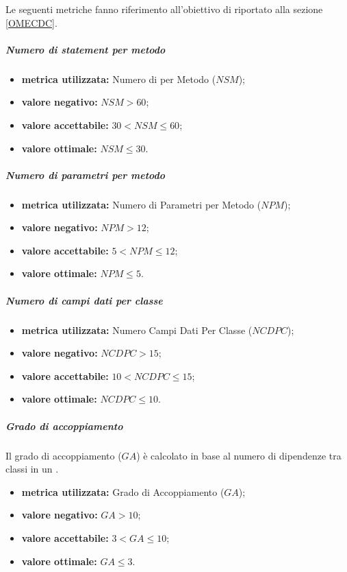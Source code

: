 				Le seguenti metriche fanno riferimento all'obiettivo di  riportato alla sezione \ref{OMECDC}.
			
				\subparagraph{Numero di statement per metodo}
				\label{MNDSPM}
				\begin{itemize}
					\item \textbf{metrica utilizzata:} Numero di  per Metodo ($NSM$);
					\item \textbf{valore negativo:} $NSM>60$;
					\item \textbf{valore accettabile:} $30< NSM\leq 60$;
					\item \textbf{valore ottimale:} $NSM\leq 30$.
				\end{itemize}
			
				\subparagraph{Numero di parametri per metodo}
				\label{MNDPPM}
				\begin{itemize}
					\item \textbf{metrica utilizzata:} Numero di Parametri per Metodo ($NPM$);
					\item \textbf{valore negativo:} $NPM>12$;
					\item \textbf{valore accettabile:} $5<NPM \leq 12$;
					\item \textbf{valore ottimale:} $NPM\leq5$.
				\end{itemize}
	
				\subparagraph{Numero di campi dati per classe}
				\label{MNDCDPC}
				\begin{itemize}
					\item \textbf{metrica utilizzata:} Numero Campi Dati Per Classe ($NCDPC$);
					\item \textbf{valore negativo:} $NCDPC>15$;
					\item \textbf{valore accettabile:} $10<NCDPC \leq 15$;
					\item \textbf{valore ottimale:} $NCDPC\leq10$.
				\end{itemize}
			
				\subparagraph{Grado di accoppiamento}
				\label{MGDA}
				Il grado di accoppiamento ($GA$) è calcolato in base al numero di dipendenze tra classi in un .
				\begin{itemize}
					\item \textbf{metrica utilizzata:} Grado di Accoppiamento ($GA$);
					\item \textbf{valore negativo:} $GA > 10$;
					\item \textbf{valore accettabile:} $3<GA \leq 10$;
					\item \textbf{valore ottimale:} $GA\leq3$.
				\end{itemize}
			

